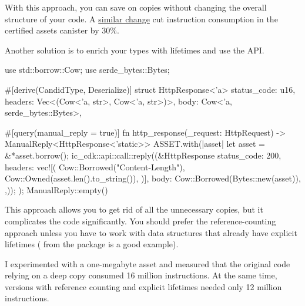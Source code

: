 \documentclass{article}
\begin{document}
With this approach, you can save on copies without changing the overall structure of your code.
A \href{https://github.com/dfinity/certified-assets/commit/47804eb70f44d2e5c73da26f0009540330293eb2}{similar change} cut instruction consumption in the certified assets canister by 30\%.

Another solution is to enrich your types with lifetimes and use the \href{https://docs.rs/ic-cdk/latest/ic_cdk/api/call/struct.ManualReply.html}{} API.

\begin{code}[rust]
use std::borrow::Cow;
use serde_bytes::Bytes;

#[derive(CandidType, Deserialize)]
struct HttpResponse<'a> {
    status_code: u16,
    headers: Vec<(Cow<'a, str>, Cow<'a, str>)>,
    body: Cow<'a, serde_bytes::Bytes>,
}

#[query(manual_reply = true)]
fn http_response(_request: HttpRequest) -> ManualReply<HttpResponse<'static>> {
    ASSET.with(|asset| {
        let asset = &*asset.borrow();
        ic_cdk::api::call::reply((&HttpResponse {
            status_code: 200,
            headers: vec![(
                Cow::Borrowed("Content-Length"),
                Cow::Owned(asset.len().to_string()),
            )],
            body: Cow::Borrowed(Bytes::new(asset)),
        },));
    });
    ManualReply::empty()
}
\end{code}

This approach allows you to get rid of all the unnecessary copies, but it complicates the code significantly.
You should prefer the reference-counting approach unless you have to work with data structures that already have explicit lifetimes (\href{https://docs.rs/ic-certified-map/0.3.0/ic_certified_map/enum.HashTree.html}{} from the \href{https://crates.io/crates/ic-certified-map}{} package is a good example).

I experimented with a one-megabyte asset and measured that the original code relying on a deep copy consumed 16 million instructions.
At the same time, versions with reference counting and explicit lifetimes needed only 12 million instructions.
\end{document}
